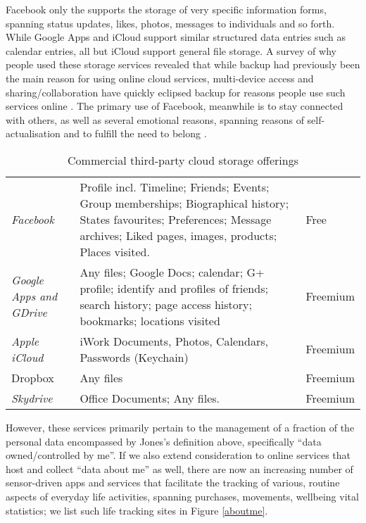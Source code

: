 \documentclass[runningheads,a4paper]{llncs}
\begin{document}
Facebook only the supports the storage of very specific information forms, spanning status updates, likes, photos, messages to individuals and so forth.  While Google Apps and iCloud support similar structured data entries such as calendar entries, all but iCloud support general file storage.  A survey of why people used these storage services revealed that while backup had previously been the main reason for using online cloud services, multi-device access and sharing/collaboration have quickly eclipsed backup for reasons people use such services online \cite{listitstudy}. The primary use of Facebook, meanwhile is to stay connected with others, as well as several emotional reasons, spanning reasons of self-actualisation and to fulfill the need to belong \cite{why-do-people-facebook}.

\begin{table}
\begin{tabular}{p{2.2cm} p{8cm} l}

\emph{Facebook} & Profile incl. Timeline; Friends; Events; Group memberships; Biographical history; States favourites; Preferences; Message archives; Liked pages, images, products; Places visited. & Free \\

\emph{Google Apps and GDrive} & Any files; Google Docs; calendar; G+ profile; identify and profiles of friends; search history; page access history; bookmarks; locations visited & Freemium\\

\emph{Apple iCloud} & iWork Documents, Photos, Calendars, Passwords (Keychain) & Freemium \\
Dropbox & Any files & Freemium \\

\emph{Skydrive} & Office Documents; Any files. & Freemium \\

\end{tabular}
\caption{Commercial third-party cloud storage offerings}
\label{fig:cloudstorage}
\end{table}

However, these services primarily pertain to the management of a fraction of the personal data encompassed by Jones's definition above, specifically ``data owned/controlled by me''.  If we also extend consideration to online services that host and collect ``data about me'' as well, there are now an increasing number of sensor-driven apps and services that facilitate the tracking of various, routine aspects of everyday life activities, spanning purchases, movements, wellbeing vital statistics; we list such life tracking sites in Figure \ref{aboutme}.
\end{document}
